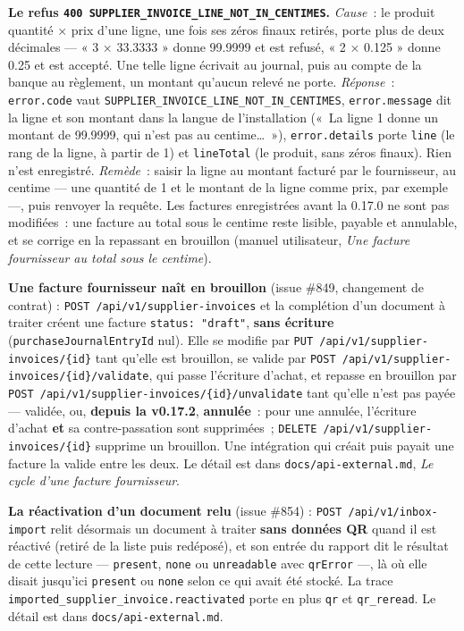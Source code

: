 \documentclass[a4paper,11pt,oneside]{article}
\begin{document}
\begin{sloppypar}
\textbf{Le refus \texttt{400 SUPPLIER\_INVOICE\_LINE\_NOT\_IN\_CENTIMES}.} \emph{Cause}~: le produit quantité × prix d'une ligne, une fois ses zéros finaux retirés, porte plus de deux décimales --- « 3 × 33.3333 » donne 99.9999 et est refusé, « 2 × 0.125 » donne 0.25 et est accepté. Une telle ligne écrivait au journal, puis au compte de la banque au règlement, un montant qu'aucun relevé ne porte. \emph{Réponse}~: \texttt{error.code} vaut \texttt{SUPPLIER\_INVOICE\_LINE\_NOT\_IN\_CENTIMES}, \texttt{error.message} dit la ligne et son montant dans la langue de l'installation («~La ligne 1 donne un montant de 99.9999, qui n'est pas au centime\ldots~»), \texttt{error.details} porte \texttt{line} (le rang de la ligne, à partir de 1) et \texttt{lineTotal} (le produit, sans zéros finaux). Rien n'est enregistré. \emph{Remède}~: saisir la ligne au montant facturé par le fournisseur, au centime --- une quantité de 1 et le montant de la ligne comme prix, par exemple ---, puis renvoyer la requête. Les factures enregistrées avant la 0.17.0 ne sont pas modifiées~: une facture au total sous le centime reste lisible, payable et annulable, et se corrige en la repassant en brouillon (manuel utilisateur, \emph{Une facture fournisseur au total sous le centime}).
\end{sloppypar}

\begin{sloppypar}
\textbf{Une facture fournisseur naît en brouillon} (issue \#849, changement de contrat) : \texttt{POST /api/v1/supplier-invoices} et la complétion d'un document à traiter créent une facture \texttt{status: "draft"}, \textbf{sans écriture} (\texttt{purchaseJournalEntryId} nul). Elle se modifie par \texttt{PUT /api/v1/supplier-invoices/\{id\}} tant qu'elle est brouillon, se valide par \texttt{POST /api/v1/supplier-invoices/\{id\}/validate}, qui passe l'écriture d'achat, et repasse en brouillon par \texttt{POST /api/v1/supplier-invoices/\{id\}/unvalidate} tant qu'elle n'est pas payée --- validée, ou, \textbf{depuis la v0.17.2}, \textbf{annulée}~: pour une annulée, l'écriture d'achat \textbf{et} sa contre-passation sont supprimées~; \texttt{DELETE /api/v1/supplier-invoices/\{id\}} supprime un brouillon. Une intégration qui créait puis payait une facture la valide entre les deux. Le détail est dans \texttt{docs/api-external.md}, \emph{Le cycle d'une facture fournisseur}.
\end{sloppypar}

\begin{sloppypar}
\textbf{La réactivation d'un document relu} (issue \#854) : \texttt{POST /api/v1/inbox-import} relit désormais un document à traiter \textbf{sans données QR} quand il est réactivé (retiré de la liste puis redéposé), et son entrée du rapport dit le résultat de cette lecture --- \texttt{present}, \texttt{none} ou \texttt{unreadable} avec \texttt{qrError} ---, là où elle disait jusqu'ici \texttt{present} ou \texttt{none} selon ce qui avait été stocké. La trace \texttt{imported\_supplier\_invoice.reactivated} porte en plus \texttt{qr} et \texttt{qr\_reread}. Le détail est dans \texttt{docs/api-external.md}.
\end{sloppypar}
\end{document}
